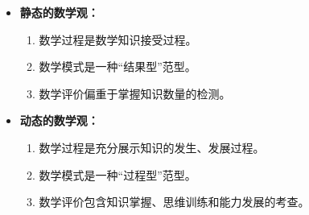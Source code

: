 \begin{multicols}{2}
\begin{itemize}
    \item \textbf{静态的数学观：}
    \begin{enumerate}
        \item 数学过程是数学知识接受过程。
        \item 数学模式是一种“结果型”范型。
        \item 数学评价偏重于掌握知识数量的检测。
    \end{enumerate}
\end{itemize}

\columnbreak

\begin{itemize}
    \item \textbf{动态的数学观：}
    \begin{enumerate}
        \item 数学过程是充分展示知识的发生、发展过程。
        \item 数学模式是一种“过程型”范型。
        \item 数学评价包含知识掌握、思维训练和能力发展的考查。
    \end{enumerate}
\end{itemize}

\end{multicols}
\clearpage
